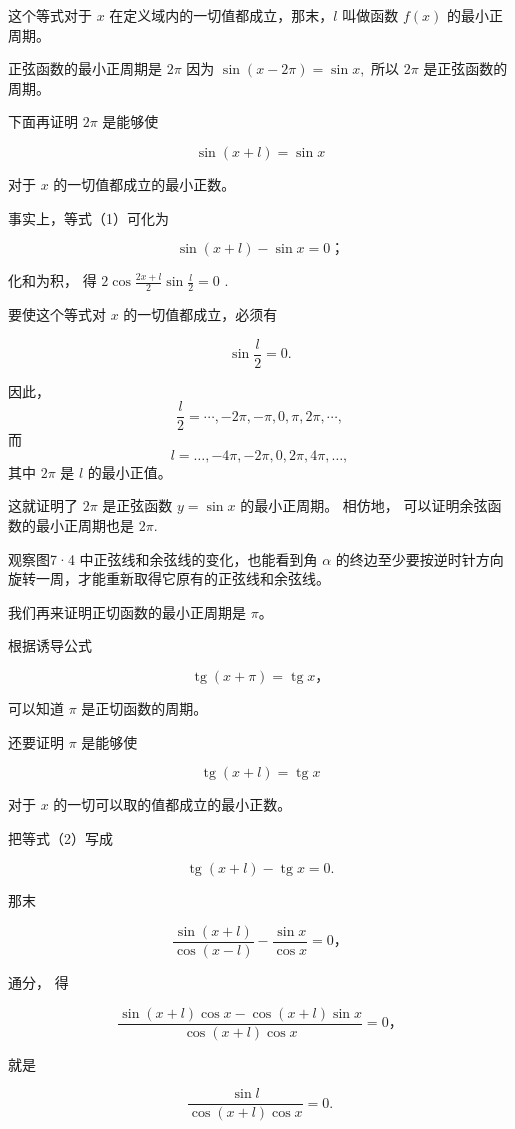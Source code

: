 这个等式对于 \(x\) 在定义域内的一切值都成立，那末，\(l\) 叫做函数
\(f(x)\) 的最小正周期。

正弦函数的最小正周期是 \(2\pi\) 因为 \(\sin (x - 2\pi) = \sin x,\) 所以
\(2\pi\) 是正弦函数的周期。

下面再证明 \(2\pi\) 是能够使

\[
\sin (x + l) = \sin x \tag {1}
\]

对于 \(x\) 的一切值都成立的最小正数。

事实上，等式（1）可化为

\[
\sin (x + l) - \sin x = 0\text{；}
\]

化和为积， 得 \(2 \cos \frac{2x + l}{2} \sin \frac{l}{2} = 0\) .

要使这个等式对 \(x\) 的一切值都成立，必须有

\[
\sin \frac {l}{2} = 0.
\]

因此，
\[
\frac{l}{2}=\cdots,-2\pi,-\pi,0,\pi,2\pi,\cdots,
\]
而
\[
l = \dots, -4\pi, -2\pi, 0, 2\pi, 4\pi, \dots,
\]
其中 \(2\pi\) 是 \(l\) 的最小正值。

这就证明了 \(2\pi\) 是正弦函数 \(y = \sin x\) 的最小正周期。 相仿地，
可以证明余弦函数的最小正周期也是 \(2\pi\).

观察图7·4 中正弦线和余弦线的变化，也能看到角 \(\alpha\)
的终边至少要按逆时针方向旋转一周，才能重新取得它原有的正弦线和余弦线。

我们再来证明正切函数的最小正周期是 \(\pi\)。

根据诱导公式

\[
\operatorname{tg} (x + \pi) = \operatorname{tg} x\text{，}
\]

可以知道 \(\pi\) 是正切函数的周期。

还要证明 \(\pi\) 是能够使

\[
\operatorname{tg} (x + l) = \operatorname{tg} x \tag {2}
\]

对于 \(x\) 的一切可以取的值都成立的最小正数。

把等式（2）写成

\[
\operatorname{tg} (x + l) - \operatorname{tg} x = 0.
\]

那末

\[
\frac {\sin (x + l)}{\cos (x - l)} - \frac {\sin x}{\cos x} = 0\text{，}
\]

通分， 得

\[
\frac {\sin (x + l) \cos x - \cos (x + l) \sin x}{\cos (x + l) \cos x} = 0\text{，}
\]

就是

\[
\frac {\sin l}{\cos (x + l) \cos x} = 0.
\]

